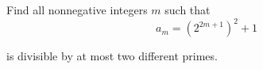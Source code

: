 Find all nonnegative integers $m$ such that\[a_m=(2^{2m+1})^2+1 \]

is divisible by at most two different primes.